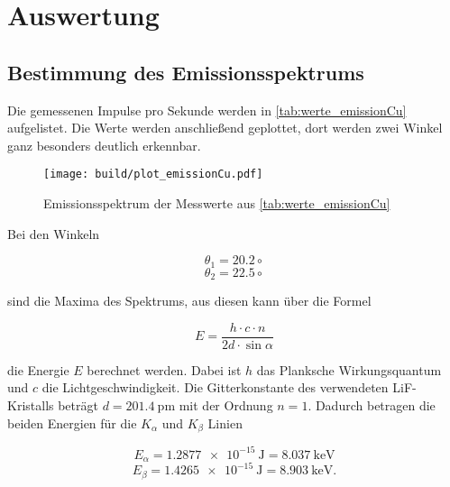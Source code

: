 \section{Auswertung}
\label{sec:Auswertung}



\subsection{Bestimmung des Emissionsspektrums}
\label{ssec:1}

Die gemessenen Impulse pro Sekunde werden in \autoref{tab:werte_emissionCu} aufgelistet.
Die Werte werden anschließend geplottet, dort werden zwei Winkel ganz besonders deutlich erkennbar.

\begin{figure}
    \centering
    \texttt{[image: build/plot\_emissionCu.pdf]}
    \caption{Emissionsspektrum der Messwerte aus \autoref{tab:werte_emissionCu}}
    \label{fig:emissionCu_plot}
\end{figure}

Bei den Winkeln 

\begin{equation}
    \theta _1 = 20.2 \circ
\end{equation}
\begin{equation}
    \theta _2 = 22.5 \circ
\end{equation}

sind die Maxima des Spektrums, aus diesen kann über die Formel 

\begin{equation}
    E = \frac{h \cdot c \cdot n}{2d \cdot \sin{\alpha}}
\end{equation}

die Energie $E$ berechnet werden.
Dabei ist $h$ das Planksche Wirkungsquantum und $c$ die Lichtgeschwindigkeit. \cite{physics_constants}
Die Gitterkonstante des verwendeten LiF-Kristalls beträgt $d = \SI{201.4}{\pico\meter}$ mit der Ordnung $n = 1$.
Dadurch betragen die beiden Energien für die $K_\alpha$ und $K_\beta$ Linien

\begin{equation*}
    E_\alpha = \SI{1.2877e-15}{\joule} = \SI{8.037}{\kilo\electronvolt}
\end{equation*}
\begin{equation*}
    E_\beta = \SI{1.4265e-15}{\joule} = \SI{8.903}{\kilo\electronvolt}.
\end{equation*}

